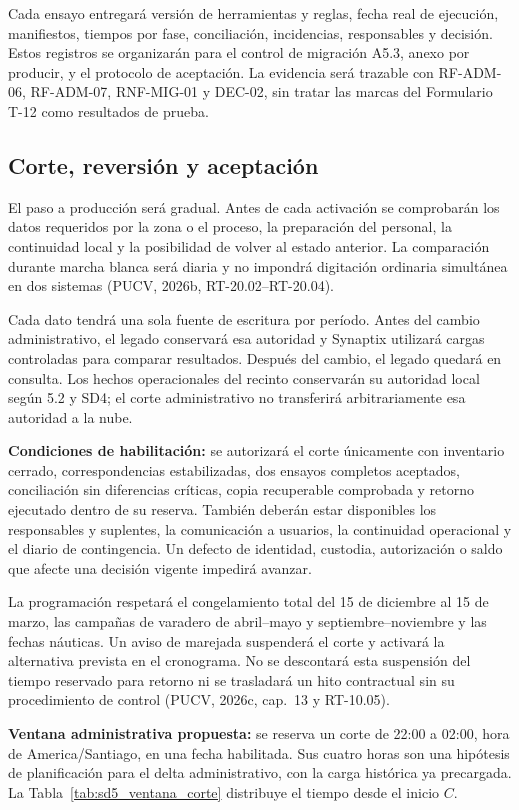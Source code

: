 Cada ensayo entregará versión de herramientas y reglas, fecha real de ejecución, manifiestos, tiempos por fase, conciliación, incidencias, responsables y decisión. Estos registros se organizarán para el control de migración A5.3, anexo por producir, y el protocolo de aceptación. La evidencia será trazable con RF-ADM-06, RF-ADM-07, RNF-MIG-01 y DEC-02, sin tratar las marcas del Formulario T-12 como resultados de prueba.

\subsection{Corte, reversión y aceptación} %
El paso a producción será gradual. Antes de cada activación se comprobarán los datos requeridos por la zona o el proceso, la preparación del personal, la continuidad local y la posibilidad de volver al estado anterior. La comparación durante marcha blanca será diaria y no impondrá digitación ordinaria simultánea en dos sistemas (PUCV, 2026b, RT-20.02--RT-20.04).

Cada dato tendrá una sola fuente de escritura por período. Antes del cambio administrativo, el legado conservará esa autoridad y Synaptix utilizará cargas controladas para comparar resultados. Después del cambio, el legado quedará en consulta. Los hechos operacionales del recinto conservarán su autoridad local según 5.2 y SD4; el corte administrativo no transferirá arbitrariamente esa autoridad a la nube.

\textbf{Condiciones de habilitación:} se autorizará el corte únicamente con inventario cerrado, correspondencias estabilizadas, dos ensayos completos aceptados, conciliación sin diferencias críticas, copia recuperable comprobada y retorno ejecutado dentro de su reserva. También deberán estar disponibles los responsables y suplentes, la comunicación a usuarios, la continuidad operacional y el diario de contingencia. Un defecto de identidad, custodia, autorización o saldo que afecte una decisión vigente impedirá avanzar.

La programación respetará el congelamiento total del 15 de diciembre al 15 de marzo, las campañas de varadero de abril--mayo y septiembre--noviembre y las fechas náuticas. Un aviso de marejada suspenderá el corte y activará la alternativa prevista en el cronograma. No se descontará esta suspensión del tiempo reservado para retorno ni se trasladará un hito contractual sin su procedimiento de control (PUCV, 2026c, cap.~13 y RT-10.05).

\textbf{Ventana administrativa propuesta:} se reserva un corte de 22:00 a 02:00, hora de America/Santiago, en una fecha habilitada. Sus cuatro horas son una hipótesis de planificación para el delta administrativo, con la carga histórica ya precargada. La Tabla~\ref{tab:sd5_ventana_corte} distribuye el tiempo desde el inicio \(C\).

